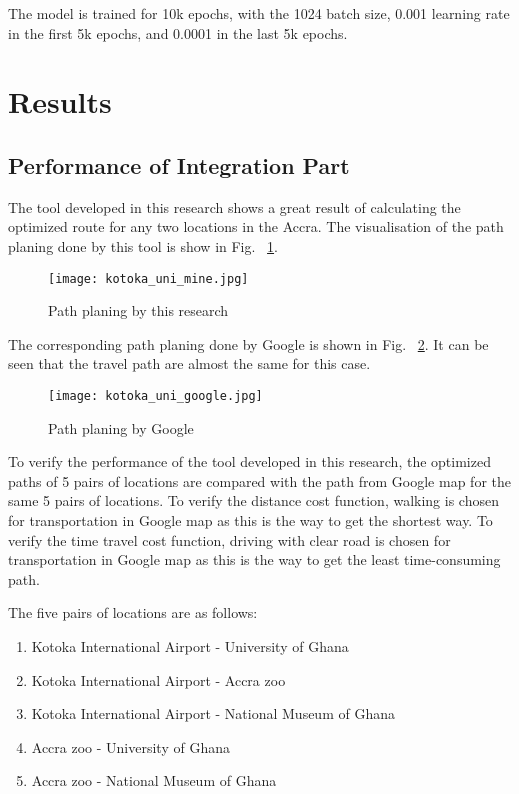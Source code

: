 \documentclass[final-report]{report-template}
\begin{document}
The model is trained for 10k epochs, with the 1024 batch size, 0.001 learning rate in the first 5k epochs, and 0.0001 in the last 5k epochs.


\section {Results}
\subsection{Performance of Integration Part}
The tool developed in this research shows a great result of calculating the optimized route for any two locations in the Accra.
The visualisation of the path planing done by this tool is show in Fig. ~\ref{fig:mine}.
\begin{figure}[H]
    \centering
    \texttt{[image: kotoka\_uni\_mine.jpg]}
    \caption{\label{fig:mine} Path planing by this research}
\end{figure}
The corresponding path planing done by Google is shown in Fig. ~\ref{fig:google}. 
It can be seen that the travel path are almost the same for this case.
\begin{figure}[H]
    \centering
    \texttt{[image: kotoka\_uni\_google.jpg]}
    \caption{\label{fig:google} Path planing by Google}
\end{figure}

To verify the performance of the tool developed in this research, 
the optimized paths of 5 pairs of locations are compared with the path from Google map for the same 5 pairs of locations.
To verify the distance cost function, walking is chosen for transportation in Google map as this is the way to get the shortest way.
To verify the time travel cost function, driving with clear road is chosen for transportation in Google map as this is the way to get the least time-consuming path.

The five pairs of locations are as follows:
\begin{enumerate}
    \item Kotoka International Airport - University of Ghana
    \item Kotoka International Airport - Accra zoo
    \item Kotoka International Airport - National Museum of Ghana
    \item Accra zoo - University of Ghana
    \item Accra zoo - National Museum of Ghana
\end{enumerate}
\end{document}
